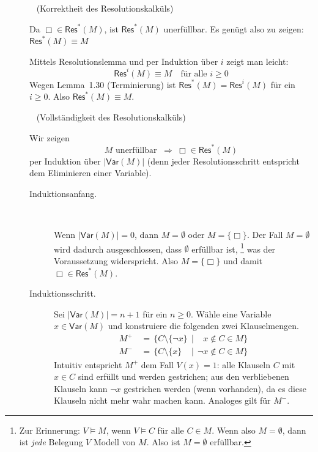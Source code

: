 \documentclass[fontsize=11pt, twoside=false, numbers=autoenddot]{scrbook}
\begin{document}
\par\noindent
\begin{beweis}
  \tikzset{baseline=5mm, grow=up, level distance=12mm, sibling distance=-18mm}
  \begin{description}
    \item[]~
      (Korrektheit des Resolutionskalküls)
      \par
      Da $\Box \in \textsf{Res}^*(M)$, ist $\textsf{Res}^*(M)$ unerfüllbar.
      Es genügt also zu zeigen: $\textsf{Res}^*(M) \equiv M$

      Mittels Resolutionslemma und per Induktion über $i$ zeigt man leicht:
      \[
        \textsf{Res}^i(M) \equiv M \quad\text{für alle~} i \geq 0
      \]
      Wegen Lemma~1.30 (Terminierung) ist $\textsf{Res}^*(M) = \textsf{Res}^i(M)$ für ein $i \geq 0$.
      Also $\textsf{Res}^*(M) \equiv M$.
    \item[]~
      (Vollständigkeit des Resolutionskalküls)
      \par
      Wir zeigen
      \[
        M \text{~unerfüllbar~} ~\Rightarrow~ \Box \in \textsf{Res}^*(M)
      \]
      per Induktion über $|\textsf{Var}(M)|$
      (denn jeder Resolutionsschritt entspricht dem Eliminieren einer Variable).
      \begin{description}
        \item[Induktionsanfang.]
          ~\par
          Wenn $|\textsf{Var}(M)| = 0$, dann $M = \emptyset$ oder $M = \{\Box\}$.
          Der Fall $M = \emptyset$ wird dadurch ausgeschlossen, dass $\emptyset$ erfüllbar ist,%
          \footnote{%
            Zur Erinnerung: $V \models M$, wenn $V \models C$ für alle $C \in M$.
            Wenn also $M = \emptyset$, dann ist \emph{jede} Belegung $V$ Modell von $M$.
            Also ist $M = \emptyset$ erfüllbar.%
          }
          was der Voraussetzung widerspricht.
          Also $M = \{\Box\}$ und damit $\Box \in \textsf{Res}^*(M)$.
        \item[Induktionsschritt.]
          Sei $|\textsf{Var}(M)| = n+1$ für ein $n \geq 0$.
          Wähle eine Variable $x \in \textsf{Var}(M)$ und konstruiere die folgenden zwei Klauselmengen.
          \begin{align*}
            M^+ & \,=\, \{C \setminus \{\lnot x\}          \,\mid\, \phantom{\lnot} x \notin C \in M\} \\
            M^- & \,=\, \{C \setminus \{x\}\phantom{\lnot} \,\mid\, \lnot x \notin C \in M\}
          \end{align*}
          Intuitiv entspricht $M^+$ dem Fall $V(x) = 1$:
          alle Klauseln $C$ mit $x \in C$ sind erfüllt und werden gestrichen;
          aus den verbliebenen Klauseln kann $\lnot x$ gestrichen werden (wenn vorhanden),
          da es diese Klauseln nicht mehr wahr machen kann. Analoges gilt für $M^-$.


\end{description}
\end{description}
\end{beweis}
\end{document}
